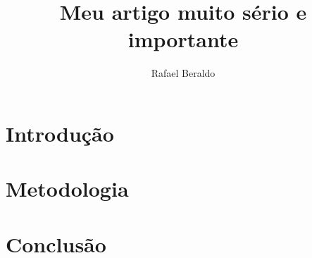 \documentclass[11pt,a4paper,oneside]{article}
\title{Meu artigo muito sério e importante}
\author{Rafael Beraldo}
\begin{document}
\frenchspacing

\maketitle

\begin{abstract}
  \blindtext
\end{abstract}

\tableofcontents

\section{Introdução}
\blindtext

\section{Metodologia}
\blindtext

\section{Conclusão}
\blindtext
\end{document}
